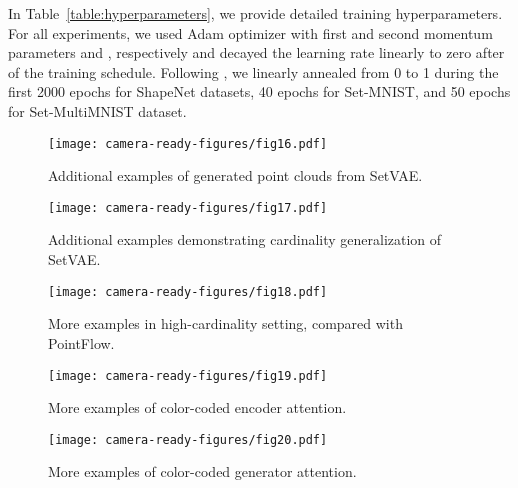 \documentclass[final]{arxiv/cvpr}
\begin{document}
In Table~\ref{table:hyperparameters}, we provide detailed training hyperparameters.
For all experiments, we used Adam optimizer with first and second momentum parameters  and , respectively and decayed the learning rate linearly to zero after  of the training schedule.
Following \cite{vahdat2020nvae}, we linearly annealed  from 0 to 1 during the first 2000 epochs for ShapeNet datasets, 40 epochs for Set-MNIST, and 50 epochs for Set-MultiMNIST dataset.

\clearpage
\begin{figure*}[!ht]
    \centering
    \texttt{[image: camera-ready-figures/fig16.pdf]}
    \caption{Additional examples of generated point clouds from SetVAE.}
    \label{fig:more_samples}
\end{figure*}
\begin{figure*}[!ht]
    \centering
    \texttt{[image: camera-ready-figures/fig17.pdf]}
    \caption{Additional examples demonstrating cardinality generalization of SetVAE.}
    \label{fig:more_disentanglement}
\end{figure*}

\begin{figure*}[!ht]
    \centering
    \texttt{[image: camera-ready-figures/fig18.pdf]}
    \caption{More examples in high-cardinality setting, compared with PointFlow.}
    \label{fig:more_mega_cardinality}
\end{figure*}
\begin{figure*}[!ht]
    \centering
    \texttt{[image: camera-ready-figures/fig19.pdf]}
    \caption{More examples of color-coded encoder attention.}
    \label{fig:more_encoder_attention}
\end{figure*}
\begin{figure*}[!ht]
    \centering
    \texttt{[image: camera-ready-figures/fig20.pdf]}
    \caption{More examples of color-coded generator attention.}
    \label{fig:more_generator_attention}
\end{figure*}
\end{document}
